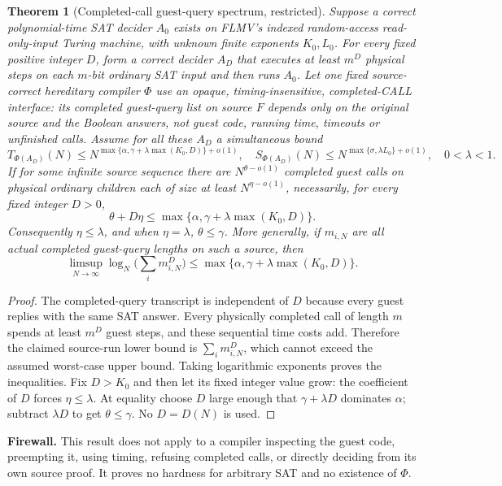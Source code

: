 \documentclass{article}
\newtheorem{theorem}{Theorem}
\begin{document}
\begin{theorem}[Completed-call guest-query spectrum, restricted]
Suppose a correct polynomial-time SAT decider \(A_0\) exists on FLMV's indexed random-access read-only-input Turing machine, with unknown finite exponents \(K_0,L_0\). For every fixed positive integer \(D\), form a correct decider \(A_D\) that executes at least \(m^D\) physical steps on each \(m\)-bit ordinary SAT input and then runs \(A_0\).
Let one fixed source-correct hereditary compiler \(\Phi\) use an \emph{opaque, timing-insensitive, completed-CALL} interface: its completed guest-query list on source \(F\) depends only on the original source and the Boolean answers, not guest code, running time, timeouts or unfinished calls. Assume for all these \(A_D\) a simultaneous bound
\[
T_{\Phi(A_D)}(N)\le N^{\max\{\alpha,\gamma+\lambda\max(K_0,D)\}+o(1)},\quad
S_{\Phi(A_D)}(N)\le N^{\max\{\sigma,\lambda L_0\}+o(1)},\quad 0<\lambda<1 .
\]
If for some infinite source sequence there are \(N^{\theta-o(1)}\) completed guest calls on physical ordinary children each of size at least \(N^{\eta-o(1)}\), necessarily, for every fixed integer \(D>0\),
\[
\boxed{\theta+D\eta\le\max\{\alpha,\gamma+\lambda\max(K_0,D)\}.}
\]
Consequently \(\eta\le\lambda\), and when \(\eta=\lambda\), \(\theta\le\gamma\). More generally, if \(m_{i,N}\) are all actual completed guest-query lengths on such a source, then
\[
\limsup_{N\to\infty}\log_N\bigl(\sum_i m_{i,N}^D\bigr)\le
\max\{\alpha,\gamma+\lambda\max(K_0,D)\}.
\]
\end{theorem}
\begin{proof}
The completed-query transcript is independent of \(D\) because every guest replies with the same SAT answer. Every physically completed call of length \(m\) spends at least \(m^D\) guest steps, and these sequential time costs add. Therefore the claimed source-run lower bound is \(\sum_i m_{i,N}^D\), which cannot exceed the assumed worst-case upper bound. Taking logarithmic exponents proves the inequalities. Fix \(D>K_0\) and then let its fixed integer value grow: the coefficient of \(D\) forces \(\eta\le\lambda\). At equality choose \(D\) large enough that \(\gamma+\lambda D\) dominates \(\alpha\); subtract \(\lambda D\) to get \(\theta\le\gamma\). No \(D=D(N)\) is used.
\end{proof}
\noindent\textbf{Firewall.} This result does not apply to a compiler inspecting the guest code, preempting it, using timing, refusing completed calls, or directly deciding from its own source proof. It proves no hardness for arbitrary SAT and no existence of \(\Phi\).
\end{document}

